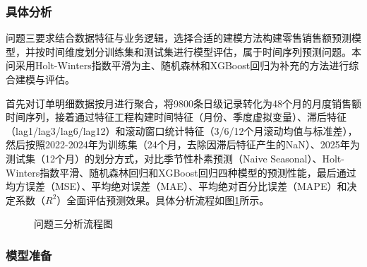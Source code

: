 

\subsubsection{具体分析}

问题三要求结合数据特征与业务逻辑，选择合适的建模方法构建零售销售额预测模型，并按时间维度划分训练集和测试集进行模型评估，属于时间序列预测问题。本问采用Holt-Winters指数平滑为主、随机森林和XGBoost回归为补充的方法进行综合建模与评估。

首先对订单明细数据按月进行聚合，将9800条日级记录转化为48个月的月度销售额时间序列，接着通过特征工程构建时间特征（月份、季度虚拟变量）、滞后特征（lag1/lag3/lag6/lag12）和滚动窗口统计特征（3/6/12个月滚动均值与标准差），然后按照2022-2024年为训练集（24个月，去除因滞后特征产生的NaN）、2025年为测试集（12个月）的划分方式，对比季节性朴素预测（Naive Seasonal）、Holt-Winters指数平滑、随机森林回归和XGBoost回归四种模型的预测性能，最后通过均方误差（MSE）、平均绝对误差（MAE）、平均绝对百分比误差（MAPE）和决定系数（$R^2$）全面评估预测效果。具体分析流程如图\ref{fig:analysis3_flow}所示。

\begin{figure}[H]
  \begin{center}
    \caption{问题三分析流程图}
    \label{fig:analysis3_flow}
  \end{center}
\end{figure}

\subsubsection{模型准备}

